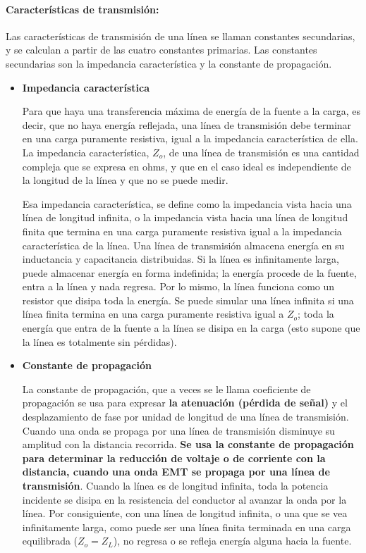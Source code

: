             \paragraph{Características de transmisión:}

            Las características de transmisión de una línea se llaman constantes secundarias, y se calculan a partir de las cuatro constantes primarias. Las constantes secundarias son la impedancia característica y la constante de propagación.

            \begin{itemize}
                \item \textbf{Impedancia característica}

                Para que haya una transferencia máxima de energía de la fuente a la carga, es decir, que no haya energía reflejada, una línea de transmisión debe terminar en una carga puramente resistiva, igual a la impedancia característica de ella. La impedancia característica, $Z_o$, de una línea de transmisión es una cantidad compleja que se expresa en ohms, y que en el caso ideal es independiente de la longitud de la línea y que no se puede medir. 
                
                Esa impedancia característica, se define como la impedancia vista hacia una línea de longitud infinita, o la impedancia vista hacia una línea de longitud finita que termina en una carga puramente resistiva igual a la impedancia característica de la línea. Una línea de transmisión almacena energía en su inductancia y capacitancia distribuidas. Si la línea es infinitamente larga, puede almacenar energía en forma indefinida; la energía procede de la fuente, entra a la línea y nada regresa. Por lo mismo, la línea funciona como un resistor que disipa toda la energía. Se puede simular una línea infinita si una línea finita termina en una carga puramente resistiva igual a $Z_o$; toda la energía que entra de la fuente a la línea se disipa en la carga (esto supone que la línea es totalmente sin pérdidas).

                \item \textbf{Constante de propagación}

                La constante de propagación, que a veces se le llama coeficiente de propagación se usa para expresar \textbf{ la atenuación (pérdida de señal)} y el desplazamiento de fase por unidad de longitud de una línea de transmisión. Cuando una onda se propaga por una línea de transmisión disminuye su amplitud con la distancia recorrida.\textbf{ Se usa la constante de propagación para determinar la reducción de voltaje o de corriente con la distancia, cuando una onda EMT se propaga por una línea de transmisión}. Cuando la línea es de longitud infinita, toda la potencia incidente se disipa en la resistencia del conductor al avanzar la onda por la línea. Por consiguiente, con una línea de longitud infinita, o una que se vea infinitamente larga, como puede ser una línea finita terminada en una carga equilibrada ($Z_o = Z_L$), no regresa o se refleja energía alguna hacia la fuente. 


\end{itemize}

